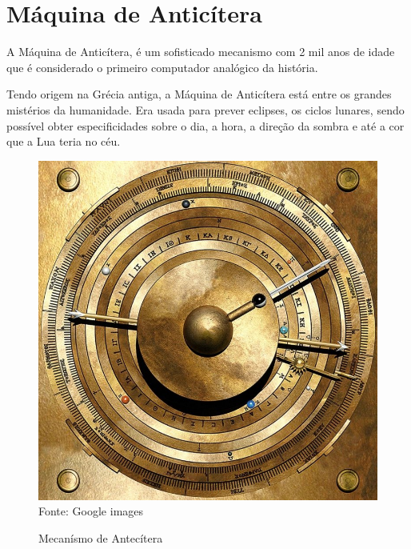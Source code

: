 \documentclass[
	12pt,				%
	openright,			%
	twoside,			%
	a4paper,			%
	english,			%
	french,				%
	spanish,			%
	brazil,				%
	]{abntex2}
\begin{document}
\chapter{Máquina de Anticítera}
A Máquina de Anticítera, é um sofisticado mecanismo com 2 mil anos de idade que é considerado o primeiro computador analógico da história.
\par
Tendo origem na Grécia antiga, a Máquina de Anticítera está entre os grandes mistérios da humanidade. Era usada para prever eclipses, os ciclos lunares, sendo possível obter especificidades sobre o dia, a hora, a direção da sombra e até a cor que a Lua teria no céu.
\begin{figure}[htb]
	\begin{center}
	\caption{\label{fig_teste}Mecanísmo de Antecítera}
	\includegraphics[scale=0.3]{img/mecanismoAnticitera.jpg} \\
	Fonte: Google images
	\end{center}
\end{figure}
\end{document}
